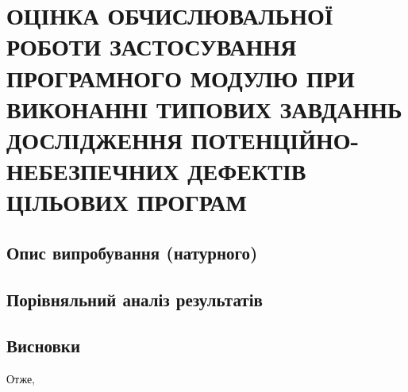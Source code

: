 \chapter{ОЦІНКА ОБЧИСЛЮВАЛЬНОЇ РОБОТИ ЗАСТОСУВАННЯ ПРОГРАМНОГО МОДУЛЮ ПРИ ВИКОНАННІ ТИПОВИХ ЗАВДАННЬ ДОСЛІДЖЕННЯ ПОТЕНЦІЙНО-НЕБЕЗПЕЧНИХ ДЕФЕКТІВ ЦІЛЬОВИХ ПРОГРАМ}
\label{4section::doc}\label{4section:id1}

\section{Опис випробування (натурного)}
\label{4section:id2}

\section{Порівняльний аналіз результатів}
\label{4section:id3}

\section*{Висновки}
Отже,
